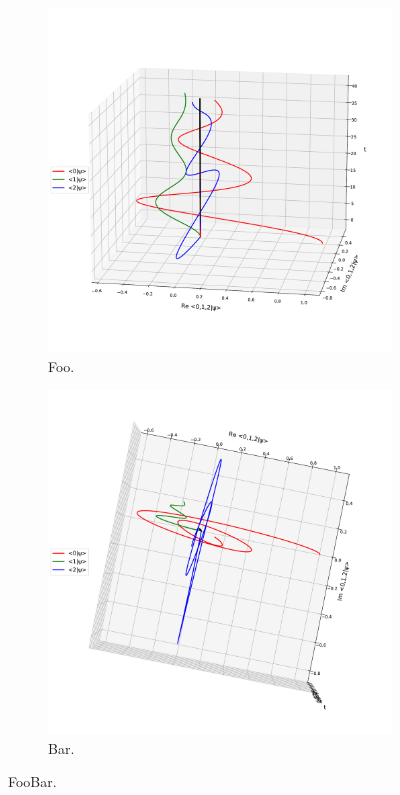 \begin{figure}[h]
  \begin{subfigure}[b]{\textwidth}
    \centering
    \includegraphics[height=0.41\textheight,clip,trim=0 90 40 140]{img/3ldetect/NonHermitianSpaceTime_side.pdf}
    \caption{Foo.}
  \end{subfigure}
  \par\bigskip
  \begin{subfigure}[b]{\textwidth}
    \centering
    \includegraphics[height=0.44\textheight,clip,trim= 0 90 20 75]{img/3ldetect/NonHermitianSpaceTime_top.pdf}
    \caption{Bar.}
  \end{subfigure}
  \caption{FooBar.}
\end{figure}
